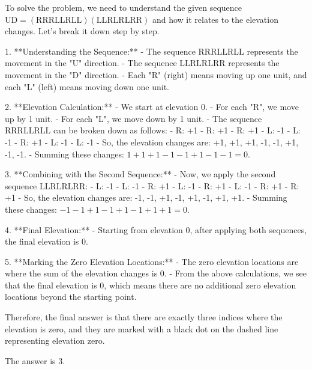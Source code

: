 To solve the problem, we need to understand the given sequence \( \text{UD} = (\text{RRRLLRLL})(\text{LLRLRLRR}) \) and how it relates to the elevation changes. Let's break it down step by step.

1. **Understanding the Sequence:**
   - The sequence \( \text{RRRLLRLL} \) represents the movement in the "U" direction.
   - The sequence \( \text{LLRLRLRR} \) represents the movement in the "D" direction.
   - Each "R" (right) means moving up one unit, and each "L" (left) means moving down one unit.

2. **Elevation Calculation:**
   - We start at elevation 0.
   - For each "R", we move up by 1 unit.
   - For each "L", we move down by 1 unit.
   - The sequence \( \text{RRRLLRLL} \) can be broken down as follows:
     - R: +1
     - R: +1
     - R: +1
     - L: -1
     - L: -1
     - R: +1
     - L: -1
     - L: -1
   - So, the elevation changes are: +1, +1, +1, -1, -1, +1, -1, -1.
   - Summing these changes: \( 1 + 1 + 1 - 1 - 1 + 1 - 1 - 1 = 0 \).

3. **Combining with the Second Sequence:**
   - Now, we apply the second sequence \( \text{LLRLRLRR} \):
     - L: -1
     - L: -1
     - R: +1
     - L: -1
     - R: +1
     - L: -1
     - R: +1
     - R: +1
   - So, the elevation changes are: -1, -1, +1, -1, +1, -1, +1, +1.
   - Summing these changes: \( -1 - 1 + 1 - 1 + 1 - 1 + 1 + 1 = 0 \).

4. **Final Elevation:**
   - Starting from elevation 0, after applying both sequences, the final elevation is 0.

5. **Marking the Zero Elevation Locations:**
   - The zero elevation locations are where the sum of the elevation changes is 0.
   - From the above calculations, we see that the final elevation is 0, which means there are no additional zero elevation locations beyond the starting point.

Therefore, the final answer is that there are exactly three indices where the elevation is zero, and they are marked with a black dot on the dashed line representing elevation zero.

The answer is \(\boxed{3}\).